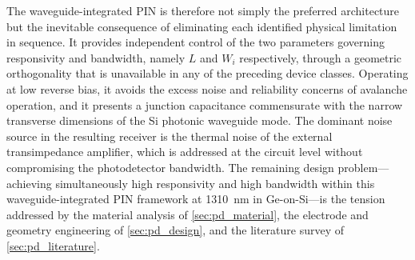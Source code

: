 The waveguide-integrated PIN is therefore not simply the preferred architecture
but the inevitable consequence of eliminating each identified physical
limitation in sequence. It provides independent control of the two parameters
governing responsivity and bandwidth, namely $L$ and $W_i$ respectively,
through a geometric orthogonality that is unavailable in any of the preceding
device classes. Operating at low reverse bias, it avoids the excess noise
and reliability concerns of avalanche operation, and it presents a junction
capacitance commensurate with the narrow transverse dimensions of the
Si photonic waveguide mode. The dominant noise source in the resulting
receiver is the thermal noise of the external transimpedance amplifier,
which is addressed at the circuit level without compromising the
photodetector bandwidth. The remaining design problem---achieving simultaneously
high responsivity and high bandwidth within this waveguide-integrated PIN
framework at \SI{1310}{\nano\metre} in Ge-on-Si---is the tension addressed
by the material analysis of \cref{sec:pd_material}, the electrode and geometry
engineering of \cref{sec:pd_design}, and the literature survey of
\cref{sec:pd_literature}.
